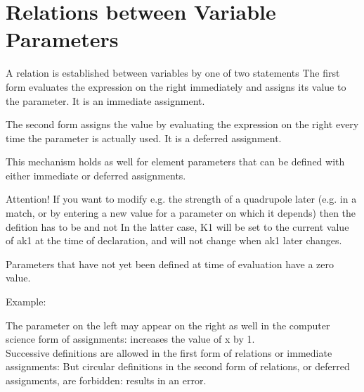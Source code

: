 \section{Relations between Variable Parameters}
\label{sec:relations}\label{sec:defer}
A relation is established between variables by one of two statements 
The first form evaluates the expression on the right immediately and
assigns its value to the parameter. It is an immediate assignment.

The second form assigns the value by evaluating  the expression on the
right every time the parameter is actually used. It is a deferred
assignment.  

This mechanism holds as well for element parameters that can be defined
with either immediate or deferred assignments.

Attention! If you want
to modify e.g. the strength of a quadrupole later (e.g. in a match,  or
by entering a new value for a parameter on which it depends) then the
defition has to be  
and not 
In the latter case, K1 will be set to the current value of ak1 at the
time of declaration, and will not change when ak1 later changes.  

Parameters that have not yet been defined at time of evaluation have a
zero value. 

Example: 

The parameter on the left may appear on the right as well in the
computer science form of assignments: 
increases the value of x by 1. \\


Successive definitions are allowed in the first form of relations or 
immediate assignments:
But circular definitions in the second form of relations, or
deferred assignments, are forbidden: 
results in an error.





